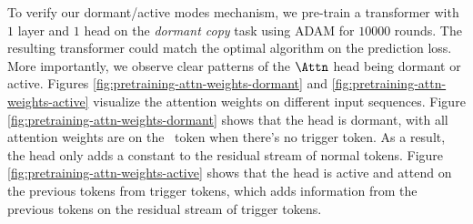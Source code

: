 To verify our dormant/active modes mechanism, we pre-train a transformer with $1$ layer and $1$ head on the \textit{dormant copy} task using ADAM for $10000$ rounds. The resulting transformer could match the optimal algorithm on the prediction loss. More importantly, we observe clear patterns of the $\Attn$ head being dormant or active. Figures \ref{fig:pretraining-attn-weights-dormant} and \ref{fig:pretraining-attn-weights-active} visualize the attention weights on different input sequences. Figure \ref{fig:pretraining-attn-weights-dormant} shows that the \Attn head is dormant, with all attention weights are on the \bos~token when there's no trigger token. As a result, the \Attn head only adds a constant to the residual stream of normal tokens. Figure \ref{fig:pretraining-attn-weights-active} shows that the \Attn head is active and attend on the previous tokens from trigger tokens, which adds information from the previous tokens on the residual stream of trigger tokens.

